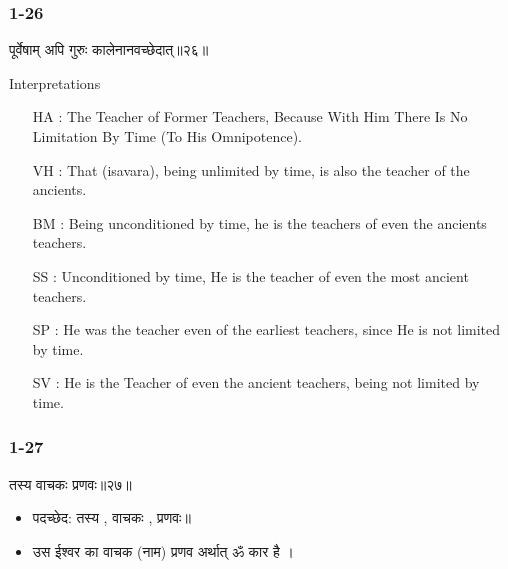 \begin{frame}[fragile]\frametitle{1-26}
\begin{sanskrit}
पूर्वेषाम् अपि गुरुः कालेनानवच्छेदात्॥२६॥
\end{sanskrit}

Interpretations
\begin{itemize}	
\item [HA]: The Teacher of Former Teachers, Because With Him There Is No Limitation By Time (To His Omnipotence).
\item [VH]: That (isavara), being unlimited by time, is also the teacher of the ancients.
\item [BM]: Being unconditioned by time, he is the teachers of even the ancients teachers.
\item [SS]: Unconditioned by time, He is the teacher of even the most ancient teachers.
\item [SP]: He was the teacher even of the earliest teachers, since He is not limited by time.
\item [SV]: He is the Teacher of even the ancient teachers, being not limited by time. 
\end{itemize}
	
\end{frame}

\begin{frame}[fragile]\frametitle{1-27}
\begin{sanskrit}
तस्य वाचकः प्रणवः॥२७॥
\end{sanskrit}

\begin{itemize}
\item पदच्छेद: तस्य , वाचकः , प्रणवः॥
\item उस ईश्वर का वाचक (नाम) प्रणव अर्थात् ॐ कार है ।
\end{itemize}
	
\end{frame}

